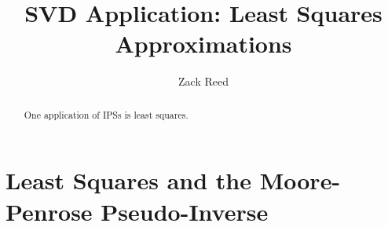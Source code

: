 \documentclass{ximera}
\author{Zack Reed}
\title{SVD Application: Least Squares Approximations}
\begin{document}
\begin{abstract}

    One application of IPSs is least squares.

\end{abstract}
\maketitle


\section{Least Squares and the Moore-Penrose Pseudo-Inverse}
\label{sec:least-squares}

\end{document}
